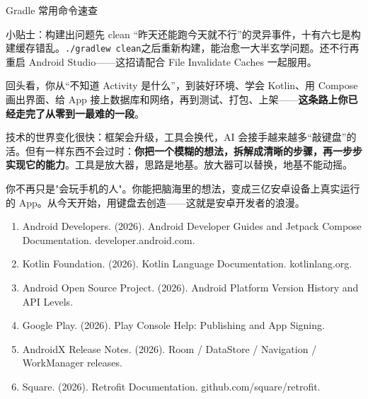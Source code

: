 \begin{center}\small\color{gray}Gradle 常用命令速查\end{center}

\begin{tcbinfo}{小贴士：构建出问题先 clean}
“昨天还能跑今天就不行”的灵异事件，十有六七是构建缓存错乱。\texttt{.\allowbreak /\allowbreak gradlew clean}之后重新构建，能治愈一大半玄学问题。还不行再重启 Android Studio——这招请配合 File Invalidate Caches 一起服用。

\end{tcbinfo}


回头看，你从“不知道 Activity 是什么”，到装好环境、学会 Kotlin、用 Compose 画出界面、给 App 接上数据库和网络，再到测试、打包、上架——\textbf{这条路上你已经走完了从零到一最难的一段}。

技术的世界变化很快：框架会升级，工具会换代，AI 会接手越来越多“敲键盘”的活。但有一样东西不会过时：\textbf{你把一个模糊的想法，拆解成清晰的步骤，再一步步实现它的能力}。工具是放大器，思路是地基。放大器可以替换，地基不能动摇。

你不再只是"会玩手机的人"。你能把脑海里的想法，变成三亿安卓设备上真实运行的 App。从今天开始，用键盘去创造——这就是安卓开发者的浪漫。


\begin{enumerate}
  \item Android Developers. (2026). Android Developer Guides and Jetpack Compose Documentation. developer.android.com.
  \item Kotlin Foundation. (2026). Kotlin Language Documentation. kotlinlang.org.
  \item Android Open Source Project. (2026). Android Platform Version History and API Levels.
  \item Google Play. (2026). Play Console Help: Publishing and App Signing.
  \item AndroidX Release Notes. (2026). Room / DataStore / Navigation / WorkManager releases.
  \item Square. (2026). Retrofit Documentation. github.com/square/retrofit.
\end{enumerate}

